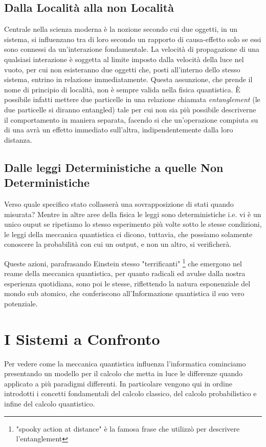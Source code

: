 \documentclass[12pt,a4paper,openright]{report}
\begin{document}
\subsection{Dalla Località alla non Località}
Centrale nella scienza moderna è la nozione secondo cui due oggetti, in un sistema, si influenzano tra di loro secondo un rapporto di causa-effetto solo se essi
sono connessi da un'interazione fondamentale. La velocità di propagazione di una qualsiasi interazione è soggetta al limite imposto dalla velocità della luce 
nel vuoto, per cui non esisteranno due oggetti che, posti all'interno dello stesso sistema, entrino in relazione immediatamente. Questa assunzione, 
che prende il nome di principio di località, non è sempre valida nella fisica quantistica. È possibile infatti
mettere due particelle in una relazione chiamata \emph{entanglement} (le due particelle si diranno entangled) tale per cui non sia più possibile
descriverne il comportamento in maniera separata, facendo si che un'operazione compiuta su di una avrà un effetto immediato sull'altra, 
indipendentemente dalla loro distanza.    

\subsection{Dalle leggi Deterministiche a quelle Non Deterministiche}
Verso quale specifico stato collasserà una sovrapposizione di stati quando misurata? Mentre in altre aree della fisica le leggi sono deterministiche 
i.e. vi è un unico ouput se ripetiamo lo stesso esperimento più volte sotto le stesse condizioni, le leggi della meccanica quantistica
ci dicono, tuttavia, che possiamo solamente conoscere la probabilità con cui un output, e non un altro, si verificherà. \par

Queste azioni, parafrasando Einstein stesso "terrificanti" \footnote{"spooky action at distance" è la famosa frase che utilizzò per descrivere l'entanglement} che emergono nel reame della meccanica quantistica, per quanto radicali ed avulse
dalla nostra esperienza quotidiana, sono poi le stesse, riflettendo la natura esponenziale del mondo sub atomico, che conferiscono all'Informazione quantistica il suo vero potenziale. 

\section{I Sistemi a Confronto}
Per vedere come la meccanica quantistica influenza l'informatica cominciamo presentando un modello per il calcolo che metta in luce 
le differenze quando applicato a più paradigmi differenti. In particolare vengono qui in ordine introdotti i concetti fondamentali 
del calcolo classico, del calcolo probabilistico e infine del calcolo quantistico.
\end{document}
